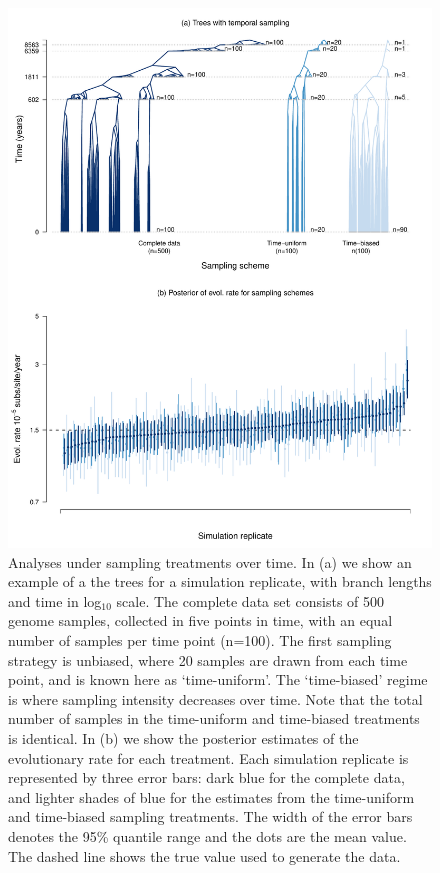 \documentclass[11pt]{article}
\begin{document}
\begin{figure}[H]
	\begin{center}
		\includegraphics[scale=0.5, angle=0]{sampling_bias_summary_trees_rates.pdf}
		\caption{Analyses under sampling treatments over time. In (a) we show an example of a the trees for a simulation replicate, with branch lengths and time in log$_{10}$ scale. The complete data set consists of 500 genome samples, collected in five points in time, with an equal number of samples per time point (n=100). The first sampling strategy is unbiased, where 20 samples are drawn from each time point, and is known here as `time-uniform'. The `time-biased' regime is where sampling intensity decreases over time. Note that the total number of samples in the time-uniform and time-biased treatments is identical. In (b) we show the posterior estimates of the evolutionary rate for each treatment. Each simulation replicate is represented by three error bars: dark blue for the complete data, and lighter shades of blue for the estimates from the time-uniform and time-biased sampling treatments. The width of the error bars denotes the 95\% quantile range and the dots are the mean value. The dashed line shows the true value used to generate the data.}
		\label{figure:Fig4}
	\end{center}
\end{figure}
\end{document}
